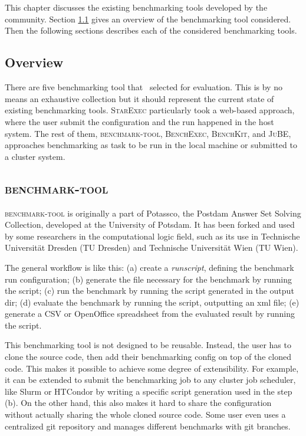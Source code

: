 \chapter{\chExisting}
\label{ch:existing}

This chapter discusses the existing benchmarking tools developed by the community.
Section \ref{sec:prior_works.overview} gives an overview of the benchmarking tool considered.
Then the following sections describes each of the considered benchmarking tools.

\section{Overview}
\label{sec:prior_works.overview}

There are five benchmarking tool that \first~selected for evaluation.
This is by no means an exhaustive collection but it should represent the current state of existing benchmarking tools.
\textsc{StarExec} particularly took a web-based approach, where the user submit the configuration and the run happened in the host system.
The rest of them, \textsc{benchmark-tool}, \textsc{BenchExec}, \textsc{BenchKit}, and \textsc{JuBE}, approaches benchmarking as task to be run in the local machine or submitted to a cluster system.

\section{\textsc{benchmark-tool}}
\textsc{benchmark-tool} is originally a part of Potassco, the Postdam Answer Set Solving Collection, developed at the University of Potsdam.
It has been forked and used by some researchers in the computational logic field, such as its use in Technische Universität Dresden (TU Dresden) and Technische Universität Wien (TU Wien).

The general workflow is like this:
(a) create a \textit{runscript}, defining the benchmark run configuration;
(b) generate the file necessary for the benchmark by running the  script;
(c) run the benchmark by running the script generated in the output dir;
(d) evaluate the benchmark by running the  script, outputting an xml file;
(e) generate a CSV or OpenOffice spreadsheet from the evaluated result by running the  script.

This benchmarking tool is not designed to be reusable.
Instead, the user has to clone the source code, then add their benchmarking config on top of the cloned code.
This makes it possible to achieve some degree of extensibility.
For example, it can be extended to submit the benchmarking job to any cluster job scheduler, like Slurm or HTCondor by writing a specific script generation used in the step (b).
On the other hand, this also makes it hard to share the configuration without actually sharing the whole cloned source code.
Some user even uses a centralized git repository and manages different benchmarks with git branches.

